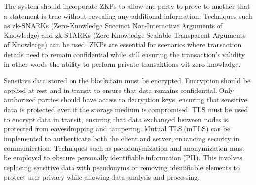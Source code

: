 \begin{enumerate}[label=\textbullet]
	The system should incorporate ZKPs to allow one party to prove to another that a statement is true without revealing any additional information. Techniques such as zk-SNARKs (Zero-Knowledge Succinct Non-Interactive Arguments of Knowledge) and zk-STARKs (Zero-Knowledge Scalable Transparent Arguments of Knowledge) can be used. ZKPs are essential for scenarios where transaction details need to remain confidential while still ensuring the transaction's validity in other words the ability to perform private transaktions wit zero knowladge. 

	Sensitive data stored on the blockchain must be encrypted. Encryption should be applied at rest and in transit to ensure that data remains confidential. Only authorized parties should have access to decryption keys, ensuring that sensitive data is protected even if the storage medium is compromised. TLS must be used to encrypt data in transit, ensuring that data exchanged between nodes is protected from eavesdropping and tampering. Mutual TLS (mTLS) can be implemented to authenticate both the client and server, enhancing security in communication. Techniques such as pseudonymization and anonymization must be employed to obscure personally identifiable information (PII). This involves replacing sensitive data with pseudonyms or removing identifiable elements to protect user privacy while allowing data analysis and processing. 


\end{enumerate}
